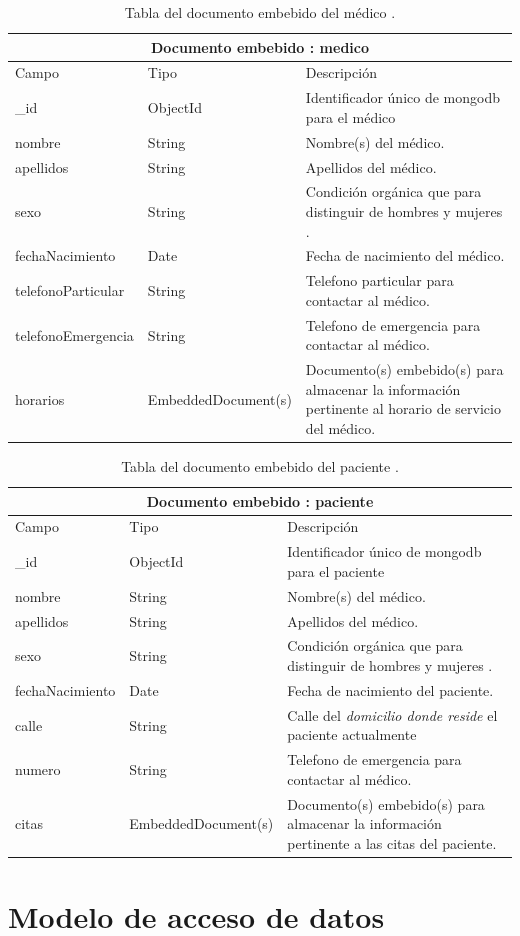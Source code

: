 	\begin{table}[htb]
	\centering
	\begin{tabular}{| p{3.5cm}| p{3.0cm} | p{9.8cm} |}
	\hline
	\multicolumn{3}{|c|}{Documento embebido : medico} \\
	\hline
	Campo & Tipo &  Descripción\\ \hline
	\_id & ObjectId & Identificador único de mongodb para el médico \\ \hline
	nombre & String & Nombre(s) del médico.\\ \hline
	apellidos & String & Apellidos del médico.\\ \hline
	sexo & String & Condición orgánica que para distinguir de hombres y mujeres .\\ \hline
	fechaNacimiento & Date &  Fecha de nacimiento del médico.\\ \hline
	telefonoParticular & String & Telefono particular para contactar al médico.\\ \hline
	telefonoEmergencia & String & Telefono de emergencia para contactar al médico.\\ \hline
	horarios & EmbeddedDocument(s) &  Documento(s) embebido(s) para almacenar la información pertinente al horario de servicio del médico.\\ \hline

	\end{tabular}
	\caption{Tabla del documento embebido del médico .}
	\label{tabla:diccionarioDatos}
	\end{table}
	\begin{table}[htb]
	\centering
	\begin{tabular}{| p{3.5cm}| p{3.0cm} | p{9.8cm} |}
	\hline
	\multicolumn{3}{|c|}{Documento embebido : paciente} \\
	\hline
	Campo & Tipo &  Descripción\\ \hline
	\_id & ObjectId & Identificador único de mongodb para el paciente \\ \hline
	nombre & String & Nombre(s) del médico.\\ \hline
	apellidos & String & Apellidos del médico.\\ \hline
	sexo & String & Condición orgánica que para distinguir de hombres y mujeres .\\ \hline
	fechaNacimiento & Date &  Fecha de nacimiento del paciente.\\ \hline
	calle & String & Calle del \textit{domicilio donde reside }el paciente actualmente\\ \hline
	numero & String & Telefono de emergencia para contactar al médico.\\ \hline
	citas & EmbeddedDocument(s) &  Documento(s) embebido(s) para almacenar la información pertinente a las citas del paciente.\\ \hline

	\end{tabular}
	\caption{Tabla del documento embebido del paciente .}
	\label{tabla:diccionarioDatos}
	\end{table}

	\newpage

\section{Modelo de acceso de datos}


